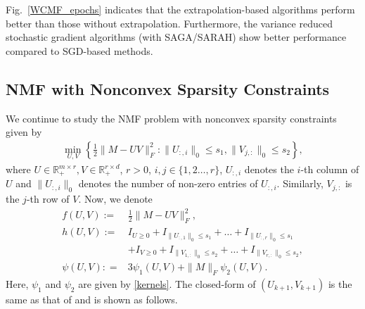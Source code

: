 \documentclass[letterpaper]{article} %
\begin{document}
	Fig.~\ref{WCMF_epochs} indicates that the extrapolation-based algorithms perform better than those without extrapolation. %
	Furthermore, the variance reduced stochastic gradient algorithms (with SAGA/SARAH) show better performance compared to SGD-based methods.



	\subsection{NMF with Nonconvex Sparsity Constraints}
	We continue to study the NMF problem with nonconvex sparsity constraints given by
	\begin{eqnarray}
		\min_{U,V} \left\{\frac{1}{2}\|M-UV\|_{F}^{2}: \|U_{:,i}\|_{0}\le s_{1}, \|V_{j,:}\|_{0}\le s_{2}\right\}, \label{SSNMF}
	\end{eqnarray}
	where $U\in\mathbb{R}^{m\times r}_{+},V\in\mathbb{R}^{r\times d}_{+}$, $r>0$, $i,j\in\{1,2\dots,r\}$, $U_{:,i}$ denotes the $i$-th column of $U$ and $\|U_{:,i}\|_{0}$ denotes the number of non-zero entries of $U_{:,i}$. Similarly,  $V_{j,:}$ is the $j$-th row of $V$. Now, we denote
	\begin{align*}
		f(U,V):=&\frac{1}{2}\|M-UV\|_{F}^{2},\\
		h(U,V):=&I_{U\ge0}+I_{\|U_{:,1}\|_{0}\le s_{1}}+\dots+I_{\|U_{:,r}\|_{0}\le s_{1}}\\&+I_{V\ge 0}+I_{\|V_{1,:}\|_{0}\le s_{2}}+\dots+I_{\|V_{r,:}\|_{0}\le s_{2}},\\
		\psi(U,V): =&3\psi_{1}(U,V)+\|M\|_{F}\psi_{2}(U,V).
	\end{align*}
	Here, $\psi_1$ and $\psi_2$ are given by \eqref{kernels}.
	The closed-form of $(U_{k+1},V_{k+1})$   is the same as that of   \cite[Proposition D.8]{MukkamalaO19} and is shown as follows.
\end{document}
